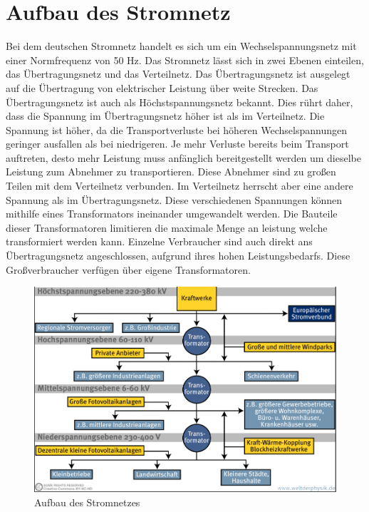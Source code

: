 \section{Aufbau des Stromnetz}
\label{capBack:Stromnetz}
Bei dem deutschen Stromnetz handelt es sich um ein Wechselspannungsnetz mit einer Normfrequenz von 50 Hz. Das Stromnetz lässt sich in zwei Ebenen einteilen, das Übertragungsnetz und das Verteilnetz. Das Übertragungsnetz ist ausgelegt auf die Übertragung von elektrischer Leistung über weite Strecken. Das Übertragungsnetz ist auch als Höchstspannungsnetz bekannt. Dies rührt daher, dass die Spannung im Übertragungsnetz höher ist als im Verteilnetz. Die Spannung ist höher, da die Transportverluste bei höheren Wechselspannungen geringer ausfallen als bei niedrigeren. Je mehr Verluste bereits beim Transport auftreten, desto mehr Leistung muss anfänglich bereitgestellt werden um dieselbe Leistung zum Abnehmer zu transportieren. Diese Abnehmer sind zu großen Teilen mit dem Verteilnetz verbunden. Im Verteilnetz herrscht aber eine andere Spannung als im Übertragungsnetz. Diese verschiedenen Spannungen können mithilfe eines Transformators ineinander umgewandelt werden. Die Bauteile dieser Transformatoren limitieren die maximale Menge an leistung welche transformiert werden kann. Einzelne Verbraucher sind auch direkt ans Übertragungsnetz angeschlossen, aufgrund ihres hohen Leistungsbedarfs. Diese Großverbraucher verfügen über eigene Transformatoren.
\begin{figure}[h!]
	\includegraphics[width=\linewidth]{img/Stromnetz1.png}
	\caption{Aufbau des Stromnetzes}
	\label{Abb1_Stromnetz}
\end{figure}


